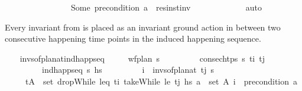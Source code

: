 \begin{isabellebody}
\ \ \ \ \ \ \ \ \ \ \ \ \ \ \ \ {\isacartoucheopen}Some\ {\isacharparenleft}{\kern0pt}precondition\ a{\isacharparenright}{\kern0pt}\ {\isacharequal}{\kern0pt}\ res{\isacharunderscore}{\kern0pt}inst{\isacharunderscore}{\kern0pt}inv\ {\isasympi}{\isacartoucheclose}\isanewline
\ \ \ \ \ \ \ \ \ \ \isamarkupfalse%
\ auto\isanewline
\ \ \ \ \ \isamarkupfalse%
\isanewline
\ \ \isamarkupfalse%
%
\endisatagproof
{\isafoldproof}%
%
\isadelimproof
%
\endisadelimproof
%
\begin{isamarkuptext}%
Every invariant from  is placed as an invariant ground 
  action in between two consecutive happening time points in the induced happening 
  sequence.%
\end{isamarkuptext}\isamarkuptrue%
\ \ \isamarkupfalse%
\ invs{\isacharunderscore}{\kern0pt}of{\isacharunderscore}{\kern0pt}plan{\isacharunderscore}{\kern0pt}at{\isacharunderscore}{\kern0pt}ind{\isacharunderscore}{\kern0pt}happ{\isacharunderscore}{\kern0pt}seq{\isacharcolon}{\kern0pt}\isanewline
\ \ \ \ \ {\isachardoublequoteopen}wf{\isacharunderscore}{\kern0pt}plan\ {\isasympi}s{\isachardoublequoteclose}\isanewline
\ \ \ \ \ \ \ \ \ {\isachardoublequoteopen}consec{\isacharunderscore}{\kern0pt}htps\ {\isasympi}s\ t\isactrlsub i\ t\isactrlsub j{\isachardoublequoteclose}\isanewline
\ \ \ \ \ \ \ \ \ {\isachardoublequoteopen}ind{\isacharunderscore}{\kern0pt}happ{\isacharunderscore}{\kern0pt}seq\ {\isasympi}s\ hs{\isachardoublequoteclose}\isanewline
\ \ \ \ \ \ \ \ \ {\isachardoublequoteopen}i\ {\isasymin}\ invs{\isacharunderscore}{\kern0pt}of{\isacharunderscore}{\kern0pt}plan{\isacharunderscore}{\kern0pt}at\ t\isactrlsub j\ {\isasympi}s{\isachardoublequoteclose}\isanewline
\ \ \ \ \ {\isachardoublequoteopen}{\isasymexists}{\isacharparenleft}{\kern0pt}t{\isacharcomma}{\kern0pt}A{\isacharparenright}{\kern0pt}\ {\isasymin}\ set\ {\isacharparenleft}{\kern0pt}dropWhile\ {\isacharparenleft}{\kern0pt}leq\ t\isactrlsub i{\isacharparenright}{\kern0pt}\ {\isacharparenleft}{\kern0pt}takeWhile\ {\isacharparenleft}{\kern0pt}le\ t\isactrlsub j{\isacharparenright}{\kern0pt}\ hs{\isacharparenright}{\kern0pt}{\isacharparenright}{\kern0pt}{\isachardot}{\kern0pt}\ {\isasymexists}a\ {\isasymin}\ set\ A{\isachardot}{\kern0pt}\ i\ {\isacharequal}{\kern0pt}\ precondition\ a{\isachardoublequoteclose}\isanewline

\end{isabellebody}
